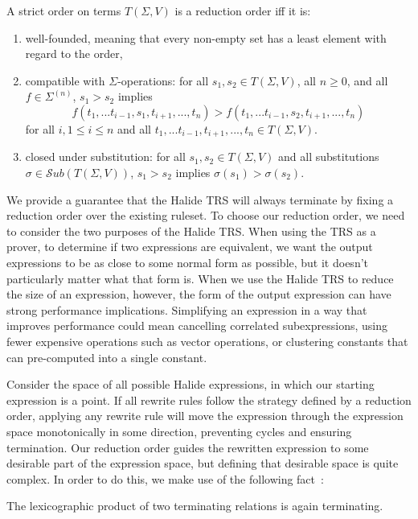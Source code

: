 \documentclass[sigplan,10pt,review,anonymous]{acmart}\settopmatter{printfolios=true,printccs=false,printacmref=false}
\begin{document}
\begin{definition}
A strict order on terms $T(\Sigma, V)$ is a reduction order iff it is: 
\begin{enumerate}
    \item well-founded, meaning that every non-empty set has a least element with regard to the order,
    \item compatible with $\Sigma$-operations: for all $s_1, s_2 \in T(\Sigma,V)$, all $n \geq 0$, and all $f \in \Sigma^{(n)}$, $s_1 > s_2$ implies
    \[ f(t_1,...t_{i-1},s_1,t_{i+1},...,t_n) > f(t_1,...t_{i-1},s_2,t_{i+1},...,t_n)
    \]
    for all $i, 1 \leq i \leq n$ and all $t_1,...t_{i-1},t_{i+1},...,t_n \in T(\Sigma,V)$.
    \item closed under substitution: for all $s_1, s_2 \in T(\Sigma,V)$ and all substitutions $\sigma \in \mathcal{S}ub(T(\Sigma,V))$, $s_1 > s_2$ implies $\sigma(s_1) > \sigma(s_2)$.
\end{enumerate}
\end{definition}

We provide a guarantee that the Halide TRS will always terminate by fixing a
reduction order over the existing ruleset. To choose our reduction order, we
need to consider the two purposes of the Halide TRS. When using the TRS
as a prover, to determine if two expressions are equivalent, we want
the output expressions to be as close to some normal form as possible, but it
doesn't particularly matter what that form is. When we use the Halide TRS
to reduce the size of an expression, however, the form of the output expression
can have strong performance implications.
Simplifying an expression in a way that
improves performance could mean cancelling correlated subexpressions, using
fewer expensive operations such as vector operations, or clustering constants
that can pre-computed into a single constant.

Consider the space of all possible Halide expressions, in which our starting
expression is a point. If all rewrite rules follow the strategy defined by a reduction order, applying any
rewrite rule will move the expression through the expression space monotonically
in some direction, preventing cycles and ensuring termination. Our reduction
order guides the rewritten expression to some desirable part of the
expression space, but defining that desirable space is quite complex. In order
to do this, we make use of the following fact~\cite{baader1999term}:

\begin{theorem}
The lexicographic product of two terminating relations is again terminating.
\end{theorem}
\end{document}
